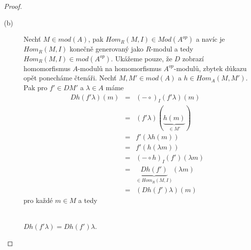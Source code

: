 \begin{proof}
\begin{description}
         \item[(b)] Nechť $M\in mod(A)$, pak $Hom_R(M,I)\in Mod(A^{op})$ a navíc 
         je $Hom_R(M,I)$ konečně generovaný jako $R$-modul a tedy $Hom_R(M,I)\in 
         mod(A^{op})$. 
         Ukážeme pouze, že $D$ zobrazí homomorfismus $A$-modulů na homomorfismus 
         $A^{op}$-modulů, zbytek důkazu opět ponecháme čtenáři. 
         Nechť $M,M'\in mod(A)$ a $h\in Hom_A(M,M')$. Pak pro $f'\in DM'$ 
         a $\lambda\in A$ máme
         \begin{eqnarray}
           Dh(f'\lambda)(m)&=& (-\circ)_I(f'\lambda)(m)  \nonumber   \\    
           &=& (f'\lambda)(\underbrace{h(m)}_{\in M'}) \nonumber \\      
           &=& f'(\lambda h (m)) \nonumber       \\
           &=& f'(h(\lambda m)) \nonumber       \\
           &=& (-\circ h)_I (f')(\lambda m) \nonumber       \\
           &=& \underbrace{Dh(f')}_{\in Hom_R(M,I)}(\lambda m) \nonumber       \\
           &=& (Dh(f')\lambda)(m) \nonumber         
         \end{eqnarray}
         pro každé $m\in M$ a tedy \\\\
         \centerline{$Dh(f'\lambda)=Dh(f')\lambda$.}
         

\end{description}
\end{proof}
